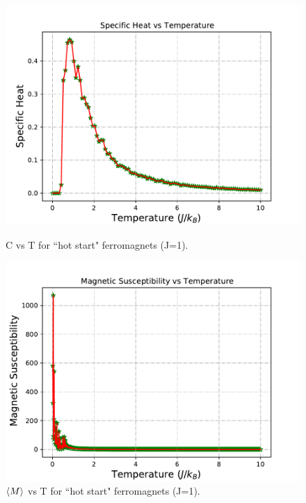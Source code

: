 \documentclass[12pt]{article}
\begin{document}
	\begin{figure}[H]
		\begin{minipage}[t]{0.5\textwidth}
			\centering
			\includegraphics[scale=0.5]{C vs T (J=1).pdf}
			\setcaptionwidth{3in}
			\caption{C vs T for ``hot start"  ferromagnets (J=1). }
			\label{fig: high start specific heat}
		\end{minipage}
		\begin{minipage}[t]{0.5\textwidth}
			\centering
			\includegraphics[scale=0.5]{X vs T (High, J=1).pdf}
			\setcaptionwidth{3in}
			\caption{$\braket{M}$ vs T for ``hot start" ferromagnets (J=1).}
			\label{fig: high start suspecibility}
		\end{minipage}
	\end{figure}
	
\end{document}
